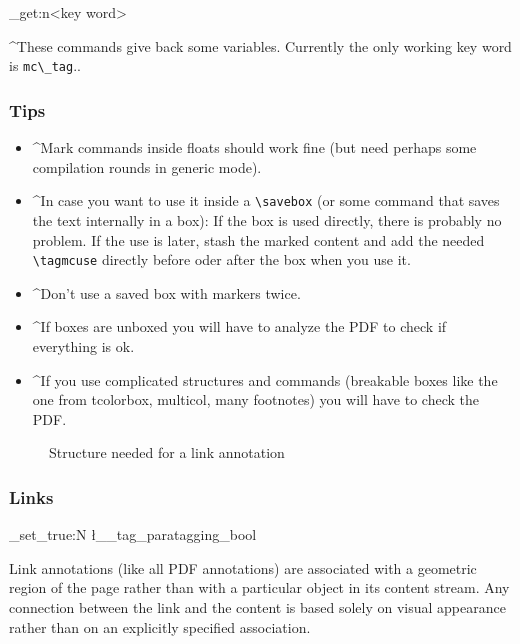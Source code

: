 \documentclass[DIV=12,parskip=half-,bibliography=totoc]{scrartcl}
\newcommand\PDF{PDF}
\newcommand\parataggingON {\bool_set_true:N \l__tag_paratagging_bool}
\begin{document}
\ExplSyntaxOn
\DescribeMacro{}
\DescribeMacro\tag_get:n{<key word>}
\ExplSyntaxOff

\TagP^These commands give back some variables. Currently the only working key word is \verb+mc\_tag+.\TagPend.



\subsubsection{Tips}

\begin{itemize}
\item \TagP^Mark commands inside floats should work fine (but need perhaps some compilation rounds in generic mode).\Pmeti
\item \TagP^In case you want to use it inside a \verb+\savebox+ (or some command that saves the text internally in a box): If the box is used directly, there is probably no problem. If the use is later, stash the marked content and add the needed \verb+\tagmcuse+ directly  before oder after the box when you use it.\Pmeti
\item \TagP^Don't use a saved box with markers twice.\Pmeti
\item \TagP^If boxes are unboxed you will have to analyze the \PDF{} to check if everything is ok.\Pmeti
\item \TagP^If you use complicated structures and commands (breakable boxes like the one from tcolorbox, multicol, many footnotes) you will have to check the \PDF{}.\Pmeti
 \end{itemize}


\begin{figure}

\tagmcend\tagstructend
{}
\caption{Structure needed for a link annotation}\label{fig:linkannot}
\tagmcend\tagstructend
\end{figure}

\subsubsection{Links}

\parataggingON

Link annotations (like all \PDF{} annotations) are associated with a geometric region of the page rather than with a particular object in its content stream. Any connection between the link and the content is based solely on visual appearance rather than on an explicitly specified association.
\end{document}

